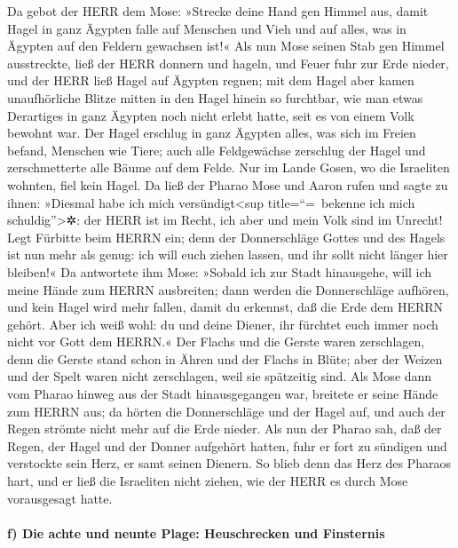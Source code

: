  Da gebot der HERR dem Mose: »Strecke deine Hand gen
Himmel aus, damit Hagel in ganz Ägypten falle auf Menschen und Vieh und
auf alles, was in Ägypten auf den Feldern gewachsen ist!«
 Als nun Mose seinen Stab gen Himmel ausstreckte, ließ
der HERR donnern und hageln, und Feuer fuhr zur Erde nieder, und der
HERR ließ Hagel auf Ägypten regnen;  mit dem Hagel aber
kamen unaufhörliche Blitze mitten in den Hagel hinein so furchtbar, wie
man etwas Derartiges in ganz Ägypten noch nicht erlebt hatte, seit es
von einem Volk bewohnt war.  Der Hagel erschlug in ganz
Ägypten alles, was sich im Freien befand, Menschen wie Tiere; auch alle
Feldgewächse zerschlug der Hagel und zerschmetterte alle Bäume auf dem
Felde.  Nur im Lande Gosen, wo die Israeliten wohnten,
fiel kein Hagel.  Da ließ der Pharao Mose und Aaron rufen
und sagte zu ihnen: »Diesmal habe ich mich versündigt\textless sup
title=``=~bekenne ich mich schuldig''\textgreater✲: der HERR ist im
Recht, ich aber und mein Volk sind im Unrecht!  Legt
Fürbitte beim HERRN ein; denn der Donnerschläge Gottes und des Hagels
ist nun mehr als genug: ich will euch ziehen lassen, und ihr sollt nicht
länger hier bleiben!«  Da antwortete ihm Mose: »Sobald
ich zur Stadt hinausgehe, will ich meine Hände zum HERRN ausbreiten;
dann werden die Donnerschläge aufhören, und kein Hagel wird mehr fallen,
damit du erkennst, daß die Erde dem HERRN gehört.  Aber
ich weiß wohl: du und deine Diener, ihr fürchtet euch immer noch nicht
vor Gott dem HERRN.«  Der Flachs und die Gerste waren
zerschlagen, denn die Gerste stand schon in Ähren und der Flachs in
Blüte;  aber der Weizen und der Spelt waren nicht
zerschlagen, weil sie spätzeitig sind.  Als Mose dann vom
Pharao hinweg aus der Stadt hinausgegangen war, breitete er seine Hände
zum HERRN aus; da hörten die Donnerschläge und der Hagel auf, und auch
der Regen strömte nicht mehr auf die Erde nieder.  Als
nun der Pharao sah, daß der Regen, der Hagel und der Donner aufgehört
hatten, fuhr er fort zu sündigen und verstockte sein Herz, er samt
seinen Dienern.  So blieb denn das Herz des Pharaos hart,
und er ließ die Israeliten nicht ziehen, wie der HERR es durch Mose
vorausgesagt hatte.

\hypertarget{f-die-achte-und-neunte-plage-heuschrecken-und-finsternis}{%
\paragraph{f) Die achte und neunte Plage: Heuschrecken und
Finsternis}\label{f-die-achte-und-neunte-plage-heuschrecken-und-finsternis}}

